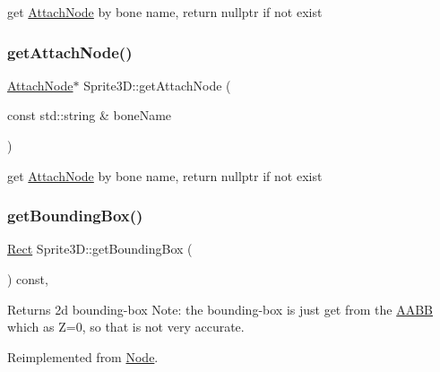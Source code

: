 get \hyperlink{classAttachNode}{Attach\+Node} by bone name, return nullptr if not exist \mbox{\label{classSprite3D_aca7485ada08a322bf2059377e7ee8603}} 
\subsubsection{\texorpdfstring{get\+Attach\+Node()}{getAttachNode()}\hspace{0.1cm}{\footnotesize\ttfamily [2/2]}}
{\footnotesize\ttfamily \hyperlink{classAttachNode}{Attach\+Node}$\ast$ Sprite3\+D\+::get\+Attach\+Node (\begin{DoxyParamCaption}\item[{const std\+::string \&}]{bone\+Name }\end{DoxyParamCaption})}

get \hyperlink{classAttachNode}{Attach\+Node} by bone name, return nullptr if not exist \mbox{\label{classSprite3D_a45348972b8ce7b37c061b9888b00613a}} 
\subsubsection{\texorpdfstring{get\+Bounding\+Box()}{getBoundingBox()}\hspace{0.1cm}{\footnotesize\ttfamily [1/2]}}
{\footnotesize\ttfamily \hyperlink{classRect}{Rect} Sprite3\+D\+::get\+Bounding\+Box (\begin{DoxyParamCaption}{ }\end{DoxyParamCaption}) const\hspace{0.3cm}{\ttfamily [override]}, {\ttfamily [virtual]}}

Returns 2d bounding-\/box Note\+: the bounding-\/box is just get from the \hyperlink{classAABB}{A\+A\+BB} which as Z=0, so that is not very accurate. 

Reimplemented from \hyperlink{classNode_a7b3849315467fdb992b273fbd3b3fc66}{Node}.

\mbox{\label{classSprite3D_a90cebd7aa44add4a6726710b5642daf4}} 
